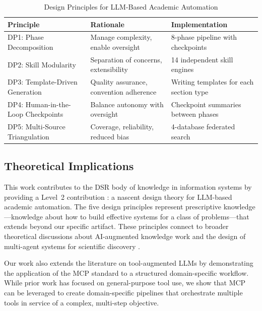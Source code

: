 \documentclass{article}
\begin{document}
\begin{table}[t]
\centering
\caption{Design Principles for LLM-Based Academic Automation}
\label{tab:design_principles}
\begin{tabularx}{\textwidth}{lXX}
\toprule
\textbf{Principle} & \textbf{Rationale} & \textbf{Implementation} \\
\midrule
DP1: Phase Decomposition & Manage complexity, enable oversight & 8-phase pipeline with checkpoints \\
DP2: Skill Modularity & Separation of concerns, extensibility & 14 independent skill engines \\
DP3: Template-Driven Generation & Quality assurance, convention adherence & Writing templates for each section type \\
DP4: Human-in-the-Loop Checkpoints & Balance autonomy with oversight & Checkpoint summaries between phases \\
DP5: Multi-Source Triangulation & Coverage, reliability, reduced bias & 4-database federated search \\
\bottomrule
\end{tabularx}
\end{table}

\subsection{Theoretical Implications}

This work contributes to the DSR body of knowledge in information systems by providing a Level~2 contribution \citep{gregor2013positioning}: a nascent design theory for LLM-based academic automation. The five design principles represent prescriptive knowledge---knowledge about how to build effective systems for a class of problems---that extends beyond our specific artifact. These principles connect to broader theoretical discussions about AI-augmented knowledge work \citep{siu2025augmenting,korinek2023language} and the design of multi-agent systems for scientific discovery \citep{ren2025scientific_intelligence,wei2025agentic_science}.

Our work also extends the literature on tool-augmented LLMs \citep{yao2022react,schick2023toolformer} by demonstrating the application of the MCP standard to a structured domain-specific workflow. While prior work has focused on general-purpose tool use, we show that MCP can be leveraged to create domain-specific pipelines that orchestrate multiple tools in service of a complex, multi-step objective.
\end{document}
